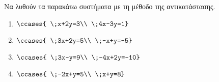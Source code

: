 Να λυθούν τα παρακάτω συστήματα με τη μέθοδο της αντικατάστασης.
\begin{multicols}{3}
\begin{enumerate}[label=\roman*.,itemsep=0mm]
\item $\ccases{
\;x+2y=3\\
\;4x-3y=1}$
\item $\ccases{
\;3x+2y=5\\
\;-x+y=-5}$
\item $\ccases{
\;3x-y=9\\
\;-4x+2y=-10}$
\item $\ccases{
\;-2x+y=5\\
\;x+y=8}$
\end{enumerate}
\end{multicols}
